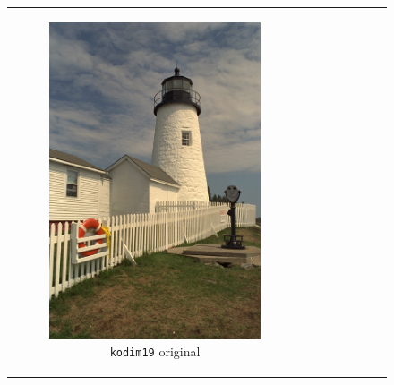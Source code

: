 \documentclass[11pt, a4]{article}
\begin{document}
\begin{enumerate}
\begin{enumerate}
\begin{figure}[H]
{\begin{tabular}{cc}
						\begin{subfigure}[h]{0.45\linewidth}
							\centering
							\includegraphics[width=\linewidth]{../kodim19.png}
							\caption{\texttt{kodim19} original}
							\label{fig:kodim19_original}
						\end{subfigure} &
						\begin{subfigure}[h]{0.455\linewidth}
							\centering

\end{subfigure}
\end{tabular}}
\end{figure}
\end{enumerate}
\end{enumerate}
\end{document}
